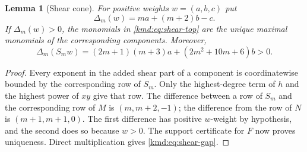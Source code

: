 \documentclass[11pt,a4paper]{article}
\numberwithin{equation}{section}
\newtheorem{lemma}[theorem]{Lemma}
\theoremstyle{definition}
\theoremstyle{remark}
\begin{document}
\begin{lemma}[Shear cone]\label{kmd:lem:shear-cone}
For positive weights $w=(a,b,c)$ put
\[
 \Delta_m(w)=ma+(m+2)b-c.
\]
If $\Delta_m(w)>0$, the monomials in \eqref{kmd:eq:shear-top} are the
unique maximal monomials of the corresponding components. Moreover,
\begin{equation}
 \Delta_m(S_mw)=(2m+1)(m+3)a+(2m^2+10m+6)b>0.
 \label{kmd:eq:shear-gap}
\end{equation}
\end{lemma}
\begin{proof}
Every exponent in the added shear part of a component is
coordinatewise bounded by the corresponding row of $S_m$. Only the
highest-degree term of $h$ and the highest power of $xy$ give that
row. The difference between a row of $S_m$ and the corresponding
row of $M$ is $(m,m+2,-1)$; the difference from the row of $N$ is
$(m+1,m+1,0)$. The first difference has positive $w$-weight by
hypothesis, and the second does so because $w>0$. The support
certificate for $F$ now proves uniqueness. Direct multiplication
gives \eqref{kmd:eq:shear-gap}.
\end{proof}
\end{document}
